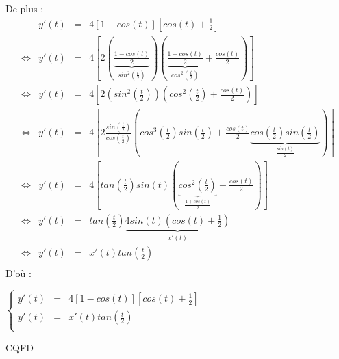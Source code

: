 De plus :
\[
  \begin{array}{crcl}
         & y'(t) & = & 4\left[1-cos(t)\right]\left[cos(t)+\frac{1}{2}\right]                             \\
    \iff & y'(t) & = & 4\left[2
      \left(\underbrace{\frac{1-cos(t)}{2}}_{sin^2\left(\frac{t}{2}\right)}\right)
    \left(\underbrace{\frac{1+cos(t)}{2}}_{cos^2\left(\frac{t}{2}\right)}+\frac{cos(t)}{2}\right)\right] \\
    \iff & y'(t) & = & 4
    \left[
      2\left(sin^2\left(\frac{t}{2}\right)\right)
      \left(cos^2\left(\frac{t}{2}\right)+\frac{cos(t)}{2}\right)
    \right]                                                                                              \\
    \iff & y'(t) & = & 4
    \left[
      2\frac{sin\left(\frac{t}{2}\right)}{cos\left(\frac{t}{2}\right)}
      \left(cos^3\left(\frac{t}{2}\right)sin\left(\frac{t}{2}\right)+\frac{cos(t)}{2}
      \underbrace{cos\left(\frac{t}{2}\right)sin\left(\frac{t}{2}\right)}_{\frac{sin(t)}{2}}
      \right)
    \right]                                                                                              \\
    \iff & y'(t) & = & 4
    \left[
      tan\left(\frac{t}{2}\right)sin(t)
      \left(
      \underbrace{cos^2\left(\frac{t}{2}\right)}_{\frac{1 + cos(t)}{2}}
      + \frac{cos(t)}{2}
      \right)
    \right]                                                                                              \\
    \iff & y'(t) & = &
    tan\left(\frac{t}{2}\right)
    \underbrace{
      4sin(t)
      \left(
      cos(t) + \frac{1}{2}
    \right)}_{x'(t)}                                                                                     \\
    \iff & y'(t) & = & x'(t)tan\left(\frac{t}{2}\right)                                                  \\
  \end{array}
\]
D'où :
\begin{result}
  $
    \left\{
    \begin{array}{rcl}
      y'(t) & = & 4\left[1-cos(t)\right]\left[cos(t)+\frac{1}{2}\right] \\
      y'(t) & = & x'(t)tan\left(\frac{t}{2}\right)                      \\
    \end{array}
    \right.
  $
\end{result}

\begin{flushright}
  CQFD
\end{flushright}

